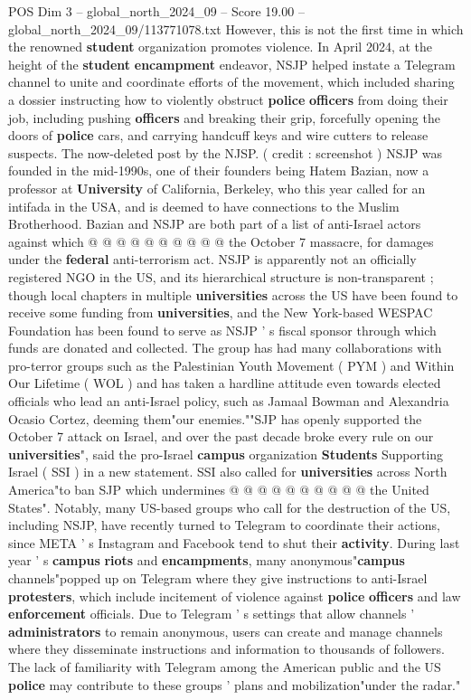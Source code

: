 \begin{textsample}{POS Dim 3 – global\_north\_2024\_09 – Score 19.00 – global\_north\_2024\_09/113771078.txt}
However, this is not the first time in which the renowned \textbf{student} organization promotes violence.
In April 2024, at the height of the \textbf{student} \textbf{encampment} endeavor, NSJP helped instate a Telegram channel to unite and coordinate efforts of the movement, which included sharing a dossier instructing how to violently obstruct \textbf{police} \textbf{officers} from doing their job, including pushing \textbf{officers} and breaking their grip, forcefully opening the doors of \textbf{police} cars, and carrying handcuff keys and wire cutters to release suspects.
The now-deleted post by the NJSP. ( credit : screenshot ) NSJP was founded in the mid-1990s, one of their founders being Hatem Bazian, now a professor at \textbf{University} of California, Berkeley, who this year called for an intifada in the USA, and is deemed to have connections to the Muslim Brotherhood.
Bazian and NSJP are both part of a list of anti-Israel actors against which @ @ @ @ @ @ @ @ @ @ the October 7 massacre, for damages under the \textbf{federal} anti-terrorism act.
NSJP is apparently not an officially registered NGO in the US, and its hierarchical structure is non-transparent ; though local chapters in multiple \textbf{universities} across the US have been found to receive some funding from \textbf{universities}, and the New York-based WESPAC Foundation has been found to serve as NSJP ' s fiscal sponsor through which funds are donated and collected.
The group has had many collaborations with pro-terror groups such as the Palestinian Youth Movement ( PYM ) and Within Our Lifetime ( WOL ) and has taken a hardline attitude even towards elected officials who lead an anti-Israel policy, such as Jamaal Bowman and Alexandria Ocasio Cortez, deeming them"our enemies.""SJP has openly supported the October 7 attack on Israel, and over the past decade broke every rule on our \textbf{universities}", said the pro-Israel \textbf{campus} organization \textbf{Students} Supporting Israel ( SSI ) in a new statement.
SSI also called for \textbf{universities} across North America"to ban SJP which undermines @ @ @ @ @ @ @ @ @ @ the United States".
Notably, many US-based groups who call for the destruction of the US, including NSJP, have recently turned to Telegram to coordinate their actions, since META ' s Instagram and Facebook tend to shut their \textbf{activity}.
During last year ' s \textbf{campus} \textbf{riots} and \textbf{encampments}, many anonymous"\textbf{campus} channels"popped up on Telegram where they give instructions to anti-Israel \textbf{protesters}, which include incitement of violence against \textbf{police} \textbf{officers} and law \textbf{enforcement} officials.
Due to Telegram ' s settings that allow channels ' \textbf{administrators} to remain anonymous, users can create and manage channels where they disseminate instructions and information to thousands of followers.
The lack of familiarity with Telegram among the American public and the US \textbf{police} may contribute to these groups ' plans and mobilization"under the radar."


\end{textsample}
